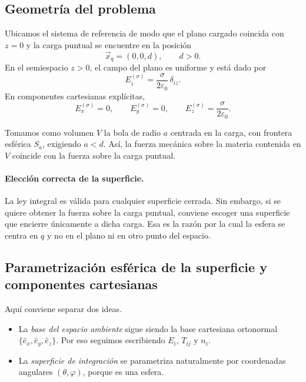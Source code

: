 \documentclass{article}
\numberwithin{equation}{section}
\begin{document}
\subsection{Geometría del problema}

Ubicamos el sistema de referencia de modo que el plano cargado coincida con $z=0$ y la carga puntual se encuentre en la posición
\begin{equation}
    \vec x_q=(0,0,d),\qquad d>0.
\end{equation}
En el semiespacio $z>0$, el campo del plano es uniforme y está dado por
\begin{equation}
    E_i^{(\sigma)}=\frac{\sigma}{2\varepsilon_0}\,\delta_{iz}.
\end{equation}
En componentes cartesianas explícitas,
\begin{equation}
    E_x^{(\sigma)}=0,\qquad E_y^{(\sigma)}=0,\qquad E_z^{(\sigma)}=\frac{\sigma}{2\varepsilon_0}.
\end{equation}

Tomamos como volumen $V$ la bola de radio $a$ centrada en la carga, con frontera esférica $S_a$, exigiendo $a<d$. Así, la fuerza mecánica sobre la materia contenida en $V$ coincide con la fuerza sobre la carga puntual.


\paragraph{Elección correcta de la superficie.}
La ley integral es válida para cualquier superficie cerrada. Sin embargo, si se quiere obtener la fuerza sobre la carga puntual, conviene escoger una superficie que encierre únicamente a dicha carga. Esa es la razón por la cual la esfera se centra en $q$ y no en el plano ni en otro punto del espacio.


\subsection{Parametrización esférica de la superficie y componentes cartesianas}

Aquí conviene separar dos ideas.
\begin{itemize}[leftmargin=1.5em]
    \item La \emph{base del espacio ambiente} sigue siendo la base cartesiana ortonormal $\{\hat e_x,\hat e_y,\hat e_z\}$. Por eso seguimos escribiendo $E_i$, $T_{ij}$ y $n_i$.
    \item La \emph{superficie de integración} se parametriza naturalmente por coordenadas angulares $(\theta,\varphi)$, porque es una esfera.
\end{itemize}
\end{document}
